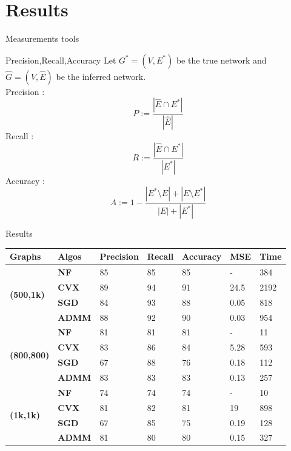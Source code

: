 \documentclass{beamer}
\begin{document}
\section{Results}
\begin{frame}{Measurements tools}
    \begin{block}{Precision,Recall,Accuracy}
    Let $G^*=(V,E^*)$ be the true network and $\hat{G} = (V, \hat{E})$ be the inferred network.\\
    Precision : \begin{equation*}
        P := \frac{|\hat{E}\cap E^*|}{|\hat{E}|}
    \end{equation*}
    Recall :\begin{equation*}
        R := \frac{|\hat{E} \cap E^*|}{|E^*|}
    \end{equation*}
    Accuracy : \begin{equation*}
        A := 1-\frac{|E^*\setminus E|+|E\setminus E^*|}{|E|+|E^*|}
    \end{equation*}
    \end{block}
\end{frame}
\begin{frame}{Results}
\begin{table}[scale = 0.5]
\begin{tabular}{|l|l|l|l|l|l|l|}
\hline
\textbf{Graphs} & \textbf{Algos} & \textbf{Precision} & \textbf{Recall} & \textbf{Accuracy} & \textbf{MSE} & \textbf{Time} \\ \hline
\multirow{4}{*}{\textbf{(500,1k)}} & \textbf{NF} & 85 & 85 & 85 & - & 384 \\ \cline{2-7} 
 & \textbf{CVX} & 89 & 94 & 91 & 24.5 & 2192 \\ \cline{2-7} 
 & \textbf{SGD} & 84 & 93 & 88 & 0.05 & 818 \\ \cline{2-7} 
 & \textbf{ADMM} & 88 & 92 & 90 & 0.03 & 954 \\ \hline
\multirow{4}{*}{\textbf{(800,800)}} & \textbf{NF} & 81 & 81 & 81 & - & 11 \\ \cline{2-7} 
 & \textbf{CVX} & 83 & 86 & 84 & 5.28 & 593 \\ \cline{2-7} 
 & \textbf{SGD} & 67 & 88 & 76 & 0.18 & 112 \\ \cline{2-7} 
 & \textbf{ADMM} & 83 & 83 & 83 & 0.13 & 257 \\ \hline
\multirow{4}{*}{\textbf{(1k,1k)}} & \textbf{NF} & 74 & 74 & 74 & - & 10 \\ \cline{2-7} 
 & \textbf{CVX} & 81 & 82 & 81 & 19 & 898 \\ \cline{2-7} 
 & \textbf{SGD} & 67 & 85 & 75 & 0.19 & 128 \\ \cline{2-7} 
 & \textbf{ADMM} & 81 & 80 & 80 & 0.15 & 327 \\ \hline
\end{tabular}
\end{table}
\end{frame}
\end{document}
